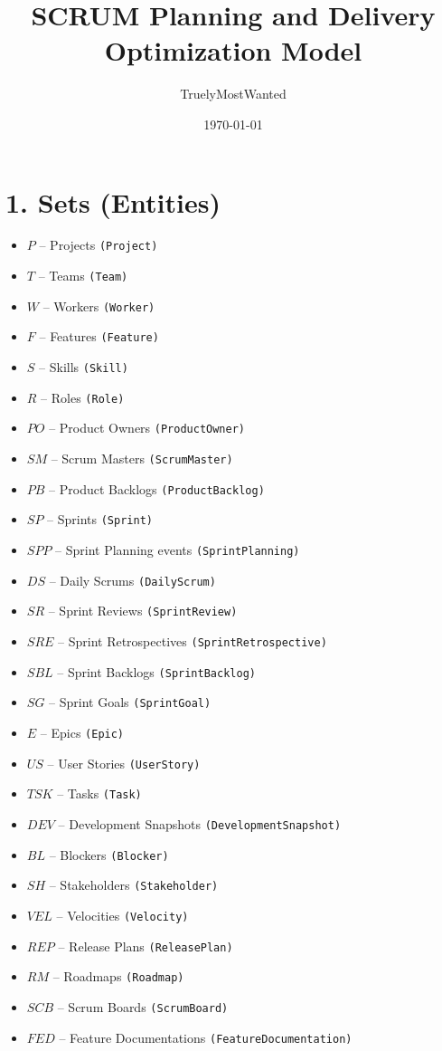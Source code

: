 \documentclass[11pt,a4paper]{article}
\title{SCRUM Planning and Delivery Optimization Model}
\author{TruelyMostWanted}
\date{\today}
\begin{document}
\maketitle
\tableofcontents
\newpage

\section{1. Sets (Entities)}
\begin{itemize}[leftmargin=2em]
  \item $P$ \;– Projects \texttt{(Project)}
  \item $T$ \;– Teams \texttt{(Team)}
  \item $W$ \;– Workers \texttt{(Worker)}
  \item $F$ \;– Features \texttt{(Feature)}
  \item $S$ \;– Skills \texttt{(Skill)}
  \item $R$ \;– Roles \texttt{(Role)}
  \item $PO$ – Product Owners \texttt{(ProductOwner)}
  \item $SM$ – Scrum Masters \texttt{(ScrumMaster)}
  \item $PB$ – Product Backlogs \texttt{(ProductBacklog)}
  \item $SP$ – Sprints \texttt{(Sprint)}
  \item $SPP$ – Sprint Planning events \texttt{(SprintPlanning)}
  \item $DS$ – Daily Scrums \texttt{(DailyScrum)}
  \item $SR$ – Sprint Reviews \texttt{(SprintReview)}
  \item $SRE$ – Sprint Retrospectives \texttt{(SprintRetrospective)}
  \item $SBL$ – Sprint Backlogs \texttt{(SprintBacklog)}
  \item $SG$ – Sprint Goals \texttt{(SprintGoal)}
  \item $E$ \;– Epics \texttt{(Epic)}
  \item $US$ – User Stories \texttt{(UserStory)}
  \item $TSK$ – Tasks \texttt{(Task)}
  \item $DEV$ – Development Snapshots \texttt{(DevelopmentSnapshot)}
  \item $BL$ – Blockers \texttt{(Blocker)}
  \item $SH$ – Stakeholders \texttt{(Stakeholder)}
  \item $VEL$ – Velocities \texttt{(Velocity)}
  \item $REP$ – Release Plans \texttt{(ReleasePlan)}
  \item $RM$ – Roadmaps \texttt{(Roadmap)}
  \item $SCB$ – Scrum Boards \texttt{(ScrumBoard)}
  \item $FED$ – Feature Documentations \texttt{(FeatureDocumentation)}
\end{itemize}
\end{document}

